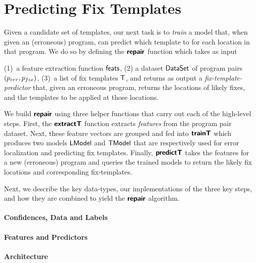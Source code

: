 \section{Predicting Fix Templates}
\label{sec:templ-pred}

Given a candidate set of templates, our next task is to \emph{train} 
a model that, when given an (erroneous) program, can predict which 
template to for each location in that program.
%
We do so by defining the $\bm{\mathsf{repair}}$ function
which takes as input 
%

(1)~a feature extraction function $\mathsf{feats}$, 
%
(2) a dataset $\mathsf{DataSet}$ of program pairs $(p_{err}, p_{fix})$,
%
(3)~a list of fix templates $\mathsf{T}$,
%
and returns as output a \emph{fix-template-predictor} that, given 
an erroneous program, returns the locations of likely fixes, and 
the templates to be applied at those locations. 

We build $\bm{\mathsf{repair}}$ using three helper functions that carry out 
each of the high-level steps.
%
First, the $\bm{\mathsf{extractT}}$ function extracts \emph{features} 
from the program pair dataset. Next, these feature vectors 
are grouped and fed into $\bm{\mathsf{trainT}}$ which produces two models 
$\mathsf{LModel}$ and $\mathsf{TModel}$ that are respectively used for error 
localization and predicting fix templates.
%
Finally, $\bm{\mathsf{predictT}}$ takes the features for 
a new (erroneous) program and queries the trained 
models to return the likely fix locations and 
corresponding fix-templates.

Next, we describe the key data-types, our implementations 
of the three key steps, and how they are combined to yield 
the $\bm{\mathsf{repair}}$ algorithm.

\paragraph{Confidences, Data and Labels}

\paragraph{Features and Predictors}

\paragraph{Architecture}


